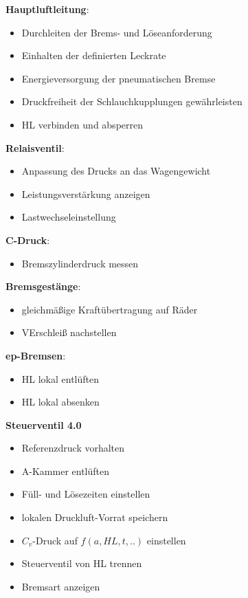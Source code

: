 \begin{fkt} \textbf{Hauptluftleitung}:
\begin{itemize}
    \item Durchleiten der Brems- und Löseanforderung
    \item Einhalten der definierten Leckrate
    \item Energieversorgung der pneumatischen Bremse
    \item Druckfreiheit der Schlauchkupplungen gewährleisten
    \item HL verbinden und absperren
\end{itemize}
\end{fkt}

\begin{fkt} \textbf{Relaisventil}:
\begin{itemize}
    \item Anpassung des Drucks an das Wagengewicht
    \item Leistungsverstärkung anzeigen
    \item Lastwechseleinstellung
\end{itemize}
\end{fkt}

\begin{fkt} \textbf{C-Druck}:
\begin{itemize}
    \item Bremszylinderdruck messen
\end{itemize}
\end{fkt}

\begin{fkt} \textbf{Bremsgestänge}:
\begin{itemize}
    \item gleichmäßige Kraftübertragung auf Räder
    \item VErschleiß nachstellen
\end{itemize}
\end{fkt}

\begin{fkt} \textbf{ep-Bremsen}:
\begin{itemize}
    \item HL lokal entlüften
    \item HL lokal absenken
\end{itemize}
\end{fkt}

\begin{fkt} \textbf{Steuerventil 4.0}
\begin{itemize}
    \item Referenzdruck vorhalten
    \item A-Kammer entlüften
    \item Füll- und Lösezeiten einstellen
    \item lokalen Druckluft-Vorrat speichern
    \item $C_v$-Druck auf $f(a, HL, t, ..)$ einstellen
    \item Steuerventil von HL trennen
    \item \gls{Bremsart} anzeigen
\end{itemize}
\end{fkt}
